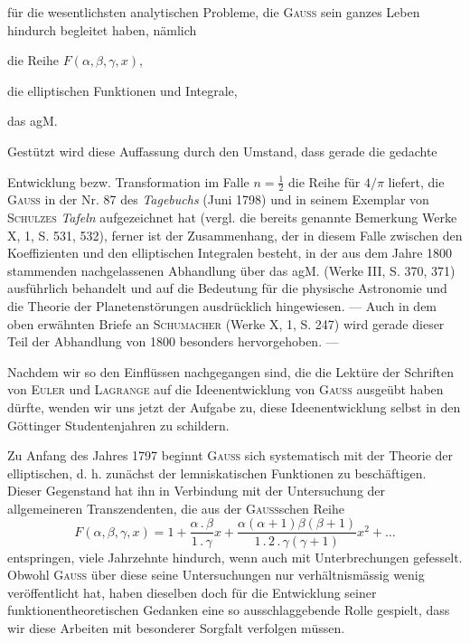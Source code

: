 für die wesentlichsten analytischen Probleme, die \textsc{Gauss} sein ganzes Leben
hindurch begleitet haben, nämlich
\begin{list}{}{\setlength{\leftmargin}{5em}\setlength{\itemsep}{0pt}\setlength{\parsep}{0pt}}
\item[1.] die Reihe \(F(\alpha,\beta,\gamma,x)\),
\item[2.] die elliptischen Funktionen und Integrale,
\item[3.] das agM.
\end{list}
\noindent Gestützt wird diese Auffassung durch den Umstand, dass gerade die gedachte\par
{}
\clearpage{}
\noindent Entwicklung bezw. Transformation im Falle \(n=\frac12\) die Reihe für \(4/\pi\) liefert,
die \textsc{Gauss} in der Nr. 87 des \textit{Tagebuchs} (Juni 1798) und in seinem Exemplar
von \textsc{Schulzes} \textit{Tafeln} aufgezeichnet hat (vergl. die bereits genannte Bemerkung
Werke X, 1, S. 531, 532), ferner ist der Zusammenhang, der in diesem Falle
zwischen den Koeffizienten und den elliptischen Integralen besteht, in der aus
dem Jahre 1800 stammenden nachgelassenen Abhandlung über das agM. (Werke
III, S. 370, 371) ausführlich behandelt und auf die Bedeutung für die physische
Astronomie und die Theorie der Planetenstörungen ausdrücklich hingewiesen.
— Auch in dem oben erwähnten Briefe an \textsc{Schumacher} (Werke X, 1,
S. 247) wird gerade dieser Teil der Abhandlung von 1800 besonders hervorgehoben. —

Nachdem wir so den Einflüssen nachgegangen sind, die die Lektüre der
Schriften von \textsc{Euler} und \textsc{Lagrange} auf die Ideenentwicklung von \textsc{Gauss} ausgeübt
haben dürfte, wenden wir uns jetzt der Aufgabe zu, diese Ideenentwicklung
selbst in den Göttinger Studentenjahren zu schildern.

Zu Anfang des Jahres 1797 beginnt \textsc{Gauss} sich systematisch mit der
Theorie der elliptischen, d. h. zunächst der lemniskatischen Funktionen zu
beschäftigen. Dieser Gegenstand hat ihn in Verbindung mit der Untersuchung
der allgemeineren Transzendenten, die aus der \textsc{Gauss}schen Reihe
\[
F(\alpha,\beta,\gamma,x)=1+\frac{\alpha\,.\,\beta}{1\,.\,\gamma}x
+\frac{\alpha(\alpha+1)\beta(\beta+1)}{1\,.\,2\,.\,\gamma(\gamma+1)}x^2+\ldots
\]
entspringen, viele Jahrzehnte hindurch, wenn auch mit Unterbrechungen gefesselt.
Obwohl \textsc{Gauss} über diese seine Untersuchungen nur verhältnismässig
wenig veröffentlicht hat, haben dieselben doch für die Entwicklung seiner
funktionentheoretischen Gedanken eine so ausschlaggebende Rolle gespielt,
dass wir diese Arbeiten mit besonderer Sorgfalt verfolgen müssen.

